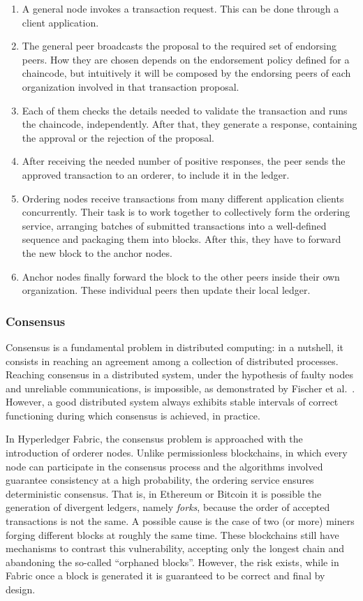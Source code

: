 \begin{enumerate}
    \item A general node invokes a transaction request. This can be done through a client application.
    \item The general peer broadcasts the proposal to the required set of endorsing peers. How they are chosen depends on the endorsement policy defined for a chaincode, but intuitively it will be composed by the endorsing peers of each organization involved in that transaction proposal.
    \item Each of them checks the details needed to validate the transaction and runs the chaincode, independently. After that, they generate a response, containing the approval or the rejection of the proposal. 
    \item After receiving the needed number of positive responses, the peer sends the approved transaction to an orderer, to include it in the ledger.
    \item Ordering nodes receive transactions from many different application clients concurrently. Their task is to work together to collectively form the ordering service, arranging batches of submitted transactions into a well-defined sequence and packaging them into blocks. After this, they have to forward the new block to the anchor nodes.
    \item Anchor nodes finally forward the block to the other peers inside their own organization. These individual peers then update their local ledger.
\end{enumerate}

\subsubsection{Consensus}
Consensus is a fundamental problem in distributed computing: in a nutshell, it consists in reaching an agreement among a collection of distributed processes.
Reaching consensus in a distributed system, under the hypothesis of faulty nodes and unreliable communications, is impossible, as demonstrated by Fischer et al.~\cite{consensus_impossible}. However, a good distributed system always exhibits stable intervals of correct functioning during which consensus is achieved, in practice.

In Hyperledger Fabric, the consensus problem is approached with the introduction of orderer nodes. Unlike permissionless blockchains, in which every node can participate in the consensus process and the algorithms involved guarantee consistency at a high probability, the ordering service ensures deterministic consensus. That is, in Ethereum or Bitcoin it is possible the generation of divergent ledgers, namely \emph{forks}, because the order of accepted transactions is not the same. A possible cause is the case of two (or more) miners forging different blocks at roughly the same time. These blockchains still have mechanisms to contrast this vulnerability, accepting only the longest chain and abandoning the so-called ``orphaned blocks''. However, the risk exists, while in Fabric once a block is generated it is guaranteed to be correct and final by design.

